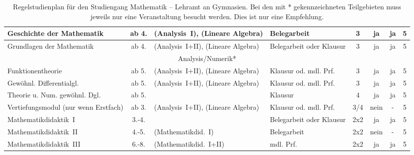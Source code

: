 \begin{table}[tbp]
\begin{footnotesize}
\begin{tabularx}{\textwidth}{|@{~}X@{~}|@{~}c@{~}|@{~}X@{~}|@{~}X@{~}|@{~}c@{~}|@{~}c@{~}|@{~}c@{~}|@{~}c@{~}|}
        Geschichte der Mathe\-matik&ab 4.&(Analysis~I), (Lineare Algebra)&Beleg\-arbeit&3&ja&ja&5\\\hline
        Grund\-lagen der Mathe\-matik&ab 4.&(Analysis~I+II), (Lineare Algebra)&Beleg\-arbeit oder Klausur&3&ja&ja&5\\\hline\hline
        \multicolumn{8}{|c|}{Analysis/Numerik*}\\\hline
        Funktionen\-theorie&ab 5.&(Analysis~I+II), (Lineare Algebra)&Klausur od. mdl. Prf.&3&ja&ja&5\\\hline
        Gewöhnl. Differentialgl.&ab 5.&(Analysis~I+II), (Lineare Algebra)&Klausur od. mdl. Prf.&3&ja&ja&5\\\hline
        Theorie u. Num. gewöhnl. Dgl.&ab 5.&&Klausur&4&ja&ja&5\\\hline\hline
        Ver\-tiefungs\-modul (nur wenn Erst\-fach)&ab 3.&(Analysis~I+II), (Lineare Algebra)&Klausur od. mdl. Prf.&3/4&nein&-&5\\\hline
        Mathe\-matik\-didaktik~I&3.-4.&&Beleg\-arbeit oder Klausur&2x2&ja&ja&5\\\hline
        Mathe\-matik\-didaktik~II&4.-5.&(Mathe\-matikdid.~I)&Beleg\-arbeit& 2x2&nein&-&5\\\hline
        Mathe\-matik\-didaktik~III&6.-8.&(Mathe\-matik\-did.~I+II)&mdl. Prf.&2x2&ja&ja&5\\\hline
    \end{tabularx}
    \end{footnotesize}
        \caption{\label{plan-lag}Regelstudienplan für den Studiengang
    Mathematik -- Lehramt an Gymnasien. Bei den mit * gekennzeichneten
    Teilgebieten muss jeweils nur eine Veranstaltung besucht werden. Dies
    ist nur eine Empfehlung.}
\end{table}


\label{studiengang_las}

